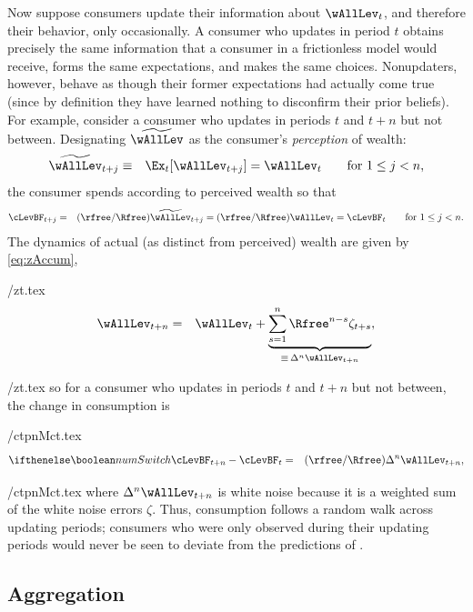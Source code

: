 Now suppose consumers update their information about $\wAllLev_t$, and therefore their behavior, only occasionally.  A consumer who updates in period $t$ obtains precisely the same information that a consumer in a frictionless model would receive, forms the same expectations, and makes the same choices.  Nonupdaters, however, behave as though their former expectations had actually come true (since by definition they have learned nothing to disconfirm their prior beliefs).  For example, consider a consumer who updates in periods $t$ and $t+n$ but not between.  Designating $\perc{\wAllLev}$ as the consumer's {\it perception} of wealth:
\begin{eqnarray*}
  \perc{\wAllLev}_{t+j} & \equiv & \Ex_{t}[\wAllLev_{t+j}] = \wAllLev_{t} \qquad \text{for }  1\le j < n,
\end{eqnarray*}
the consumer spends according to perceived wealth so that
\begin{eqnarray*}
  \cLevBF_{t+j} & = & (\rfree/\Rfree)\perc{\wAllLev}_{t+j} = (\rfree/\Rfree)     \wAllLev _{t} = \cLevBF_{t} \qquad \text{for }  1\le j < n.
\end{eqnarray*}
The dynamics of actual (as distinct from perceived) wealth are given by \eqref{eq:zAccum},
\begin{verbatimwrite}{\eq/zt.tex}
  \begin{eqnarray*}
    \wAllLev_{t+n} & = & \wAllLev_{t}+\underbrace{\sum_{s=1}^{n} \Rfree^{n-s}\zeta_{t+s}}_{\equiv\,\Delta^{n} \wAllLev_{t+n}},
  \end{eqnarray*}
\end{verbatimwrite}
 \eq/zt.tex
so for a consumer who updates in periods $t$ and $t+n$ but not between, the change in consumption is
\begin{verbatimwrite}{\eq/ctpnMct.tex}
  \begin{eqnarray*}
    \ifnumSw        \cLevBF_{t+n}-\cLevBF_{t}  & = & (\rfree/\Rfree)\Delta^{n}\wAllLev_{t+n},
  \end{eqnarray*}
\end{verbatimwrite}
 {\eq/ctpnMct.tex} where $\Delta^{n}\wAllLev_{t+n}$ is white noise because it is a weighted sum of the white noise errors $\zeta$.  Thus, consumption follows a random walk across updating periods; consumers who were only observed during their updating periods would never be seen to deviate from the predictions of \cite{hallRandomWalk}.


\subsection{Aggregation}

